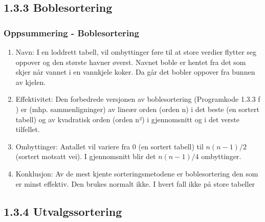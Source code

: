 \documentclass[11pt]{article}
\begin{document}
    \subsection{1.3.3 Boblesortering}
        \subsubsection{Oppsummering - Boblesortering}
            \begin{enumerate}
                \item Navn: I en loddrett tabell, vil ombyttinger føre til at store verdier flytter seg oppover
                    og den største havner øverst. Navnet boble er hentet fra det som skjer når vannet i en
                    vannkjele koker. Da går det bobler oppover fra bunnen av kjelen.
                \item Effektivitet: Den forbedrede versjonen av boblesortering (Programkode 1.3.3 f ) er
                    (mhp. sammenligninger) av lineær orden (orden n) i det beste (en sortert tabell) og av
                    kvadratisk orden (orden n²) i gjennomsnitt og i det verste tilfellet.
                \item Ombyttinger: Antallet vil variere fra 0 (en sortert tabell) til $n(n - 1)/2$ (sortert motsatt
                    vei). I gjennomsnitt blir det $n(n - 1)/4$ ombyttinger.
                \item Konklusjon: Av de mest kjente sorteringsmetodene er boblesortering den som er
                    minst effektiv. Den brukes normalt ikke. I hvert fall ikke på store tabeller
            \end{enumerate}
        
    \subsection{1.3.4 Utvalgssortering}
\end{document}
